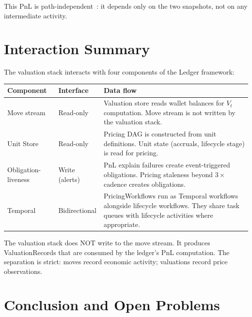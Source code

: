 \documentclass[11pt,a4paper]{article}
\begin{document}
This PnL is path-independent~\cite[\S4.3]{ledger}: it depends only on the two snapshots, not on any intermediate activity.

\clearpage
\section{Interaction Summary}
\label{sec:interactions}

The valuation stack interacts with four components of the Ledger framework:

\begin{center}
\small
\begin{tabular}{l p{4.5cm} p{6cm}}
\toprule
\textbf{Component} & \textbf{Interface} & \textbf{Data flow} \\
\midrule
Move stream~\cite[\S8]{ledger} & Read-only & Valuation store reads wallet balances for $V_t$ computation. Move stream is not written by the valuation stack. \\
Unit Store~\cite[\S3]{ledger} & Read-only & Pricing DAG is constructed from unit definitions. Unit state (accruals, lifecycle stage) is read for pricing. \\
Obligation-liveness~\cite[\S14.7]{ledger} & Write (alerts) & PnL explain failures create event-triggered obligations. Pricing staleness beyond $3\times$ cadence creates obligations. \\
Temporal~\cite[\S14]{ledger} & Bidirectional & PricingWorkflows run as Temporal workflows alongside lifecycle workflows. They share task queues with lifecycle activities where appropriate. \\
\bottomrule
\end{tabular}
\end{center}

\noindent The valuation stack does NOT write to the move stream.  It produces ValuationRecords that are consumed by the ledger's PnL computation.  The separation is strict: moves record economic activity; valuations record price observations.

\clearpage
\section{Conclusion and Open Problems}
\label{sec:conclusion}
\end{document}
